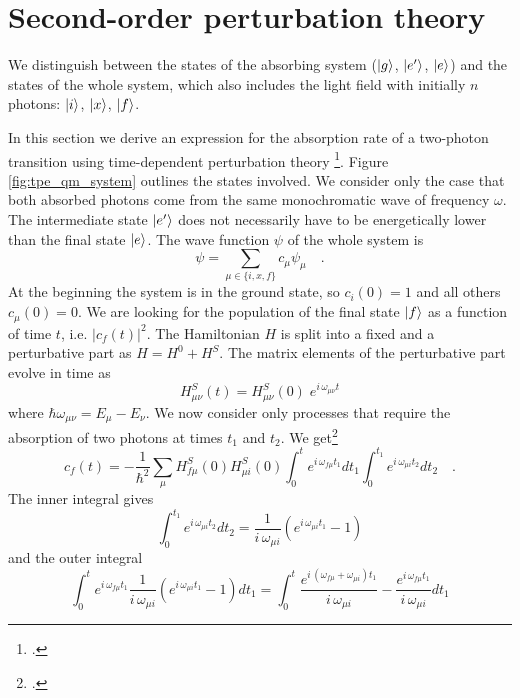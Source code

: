 \section{Second-order perturbation theory}

\begin{marginfigure}
\caption{
We distinguish between the states of the absorbing system ($\ket{g}$, $\ket{e'}$, $\ket{e}$) and the states of the whole system, which also includes the light field with initially $n$ photons: $\ket{i}$, $\ket{x}$, $\ket{f}$. }
\label{fig:tpe_qm_system}
\end{marginfigure}

In this section we derive an expression for the absorption rate of a two-photon transition using time-dependent perturbation theory \footcite{Haken_wolf_II,mystre_quantum_optics}. Figure \ref{fig:tpe_qm_system} outlines the states involved. We consider only the case that both absorbed photons come from the same monochromatic wave of frequency $\omega$. The intermediate state $\ket{e'}$ does not necessarily have to be energetically lower than the final state $\ket{e}$. The wave function $\psi$ of the whole system is
\begin{equation}
\psi = \sum_{\mu \in \{i, x, f\}} c_{\mu} \psi_{\mu} \quad.
\end{equation}
At the beginning the system is in the ground state, so $c_i(0) = 1$ and all others $c_{\mu}(0) = 0$. We are looking for the population of the final state $\ket{f}$ as a function of time $t$, i.e. $|c_f(t)|^2$. The Hamiltonian $H$ is split into a fixed and a perturbative part as $H = H^0 + H^S$.  The matrix elements of the perturbative part evolve in time as
\begin{equation}
H^S_{\mu \nu} (t) = H^S_{\mu \nu} (0) \; e^{i \, \omega_{\mu \nu} t}
\end{equation}
where $\hbar \omega_{\mu \nu} = E_{\mu} - E_{\nu}$. We now consider only processes that require the absorption of two photons at times $t_1$ and $t_2$. We get\footcite{Haken_wolf_II}
\begin{equation}
c_f(t) = - \frac{1}{\hbar^2} \sum_{\mu} H^S_{f \mu} (0) H^S_{\mu i} (0)\int_0^t e^{i \,\omega_{f \mu} t_1} dt_1 \int_0^{t_1} e^{i \,\omega_{\mu i} t_2} dt_2 \quad .
\end{equation}
The inner integral gives
\begin{equation}
\int_0^{t_1} e^{i \,\omega_{\mu i} t_2} dt_2 =
\frac{1}{i \,\omega_{\mu i}} \left( e^{i \,\omega_{\mu i} t_1} -1
\right)
\end{equation}
and the outer integral
\begin{equation}
\int_0^t e^{i \,\omega_{f \mu} t_1} \frac{1}{i \,\omega_{\mu i}}
\left( e^{i \,\omega_{\mu i} t_1} -1 \right) dt_1 = %
\int_0^t  \frac{e^{i \,(\omega_{f \mu}+\omega_{ \mu i}) t_1}}{i
\,\omega_{\mu i}} %
-   \frac{e^{i \,\omega_{ f \mu } t_1}}{i \,\omega_{\mu i}} dt_1
\end{equation}

